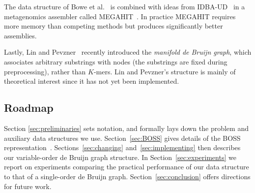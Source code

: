 The data structure of Bowe et al.~\cite{bowe}
is combined with ideas from IDBA-UD~\cite{idbaud} in a metagenomics assembler
called MEGAHIT~\cite{megahit}.  In practice MEGAHIT requires more memory than
competing methods 
but produces significantly better assemblies.

Lastly, Lin and Pevzner~\cite{mdbg} recently introduced the {\em manifold de
Bruijn graph}, which 
associates arbitrary substrings with nodes (the substrings are fixed during
preprocessing), rather than $K$-mers. Lin and Pevzner's structure is mainly of
theoretical interest since it has not yet been implemented.

\subsection{Roadmap} Section \ref{sec:preliminaries} sets notation, and formally
lays down the problem and auxiliary data structures we use.
Section~\ref{sec:BOSS} gives details of the BOSS representation~\cite{bowe}.
Sections~\ref{sec:changing} and~\ref{sec:implementing} then describes our
variable-order de Bruijn graph structure. In Section~\ref{sec:experiments} we
report on experiments comparing the practical performance of our data structure
to that of a single-order de Bruijn graph. Section~\ref{sec:conclusion} offers
directions for future work.

